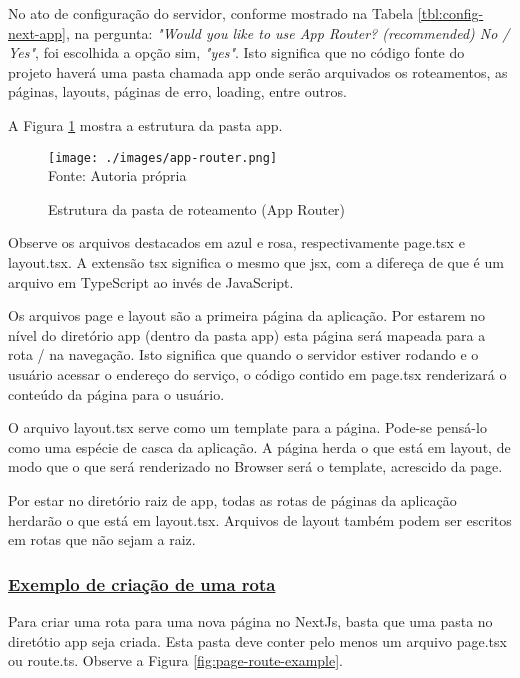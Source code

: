 No ato de configuração do servidor, conforme mostrado na
Tabela \ref{tbl:config-next-app},
na pergunta:
\textit{"Would you like to use App Router? (recommended) No / Yes"},
foi escolhida a opção sim, \textit{"yes"}.
Isto significa que no código fonte do projeto haverá uma pasta
chamada
\acrshort{app}
onde serão arquivados os roteamentos, as páginas,
layouts, páginas de erro, loading, entre outros.

A
Figura \ref{fig:app-router}
mostra a estrutura da pasta
\acrshort{app}.

\begin{figure}[H]
    \centering
    \caption{Estrutura da pasta de roteamento (App Router)}
    \texttt{[image: ./images/app-router.png]}
    \label{fig:app-router} \\
    \textnormal{\fontsize{10pt}{12pt}Fonte: Autoria própria}
\end{figure}

Observe os arquivos destacados em azul e rosa, respectivamente
page.tsx e  layout.tsx. A extensão
\acrshort{tsx}
significa o mesmo que
\acrshort{jsx},
com a difereça de que é um arquivo em TypeScript ao
invés de JavaScript.

Os arquivos page e layout são a primeira página da aplicação.
Por estarem no nível do diretório
\acrshort{app} (dentro da pasta app)
esta página será mapeada para a rota / na navegação. Isto
significa que quando o servidor estiver rodando e o usuário
acessar o endereço do serviço, o código contido em
page.tsx renderizará o conteúdo da página para o
usuário.

O arquivo layout.tsx serve como um template para a página.
Pode-se pensá-lo como uma espécie de casca da aplicação.
A página herda o que está em layout, de modo que o que será
renderizado no Browser será o template, acrescido da page.

Por estar no diretório raiz de app, todas as rotas de páginas
da aplicação herdarão o que está em layout.tsx. Arquivos de 
layout também podem ser escritos em rotas que não sejam a raiz.

\subsubsection{\underline{Exemplo de criação de uma rota}}

Para criar uma rota para uma nova página no NextJs, basta que
uma pasta no diretótio app seja criada. Esta pasta deve conter
pelo menos um arquivo page.tsx ou route.ts. Observe a
Figura \ref{fig:page-route-example}.


